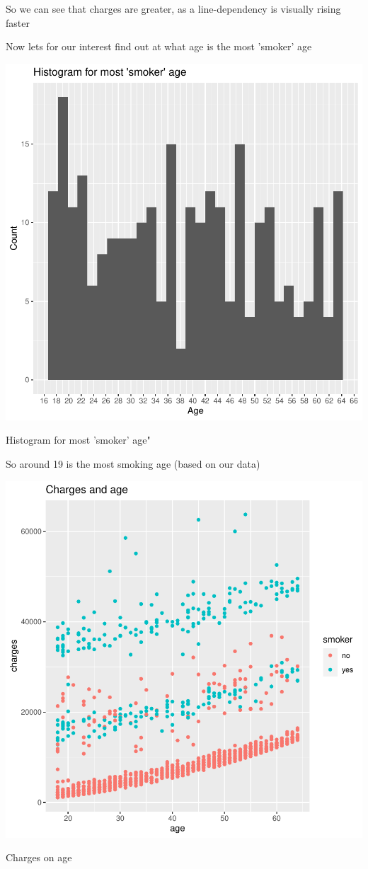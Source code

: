 \documentclass{article}
\begin{document}
So we can see that charges are greater, as a line-dependency is visually rising faster

Now lets for our interest find out at what age is the most 'smoker' age

\begin{centerfig}
\includegraphics{Untitled-047}
\caption{Histogram for most 'smoker' age"}
\end{centerfig}

So around 19 is the most smoking age (based on our data)

\begin{centerfig}
\includegraphics{Untitled-048}
\caption{Charges on age}
\end{centerfig}
\end{document}
